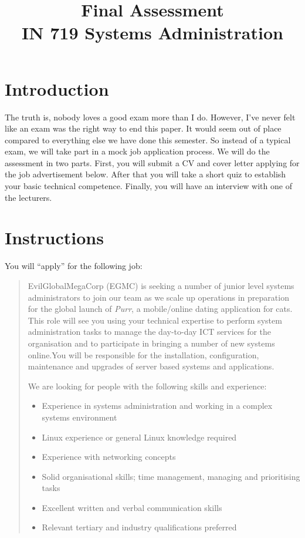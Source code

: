 \documentclass{article}   	%
\title{Final Assessment\\ IN 719  Systems Administration}
\date{}							%
\begin{document}
\maketitle

\section{Introduction}
The truth is, nobody loves a good exam more than I do. However, I've never felt like an exam was the right way to end this paper. It would seem out of place compared to everything else we have done this semester. So instead of a typical exam, we will take part in a mock job application process. We will do the assessment in two parts. First, you will submit a CV and cover letter applying for the job advertisement below. After that you will take a short quiz to establish your basic technical competence. Finally, you will have an interview with one of the lecturers.

\section{Instructions}
You will ``apply'' for the following job:

\begin{quotation}
  EvilGlobalMegaCorp (EGMC) is seeking a number of junior level systems administrators to join our team as we scale up operations in preparation for the global launch of \emph{Purr}, a mobile/online dating application for cats.  This role will see you using your technical expertise to perform system administration tasks to manage the day-to-day ICT services for the organisation and to participate in bringing a number of new systems online.You will be responsible for the installation, configuration, maintenance and upgrades of server based systems and applications.
  
  We are looking for people with the following skills and experience:
  \begin{itemize}
    \item Experience in systems administration and working in a complex systems environment
    \item Linux experience or general Linux knowledge required 
    \item Experience with networking concepts
    \item Solid organisational skills; time management, managing and prioritising tasks
    \item Excellent written and verbal communication skills
    \item Relevant tertiary and industry qualifications preferred
  \end{itemize}
\end{quotation}
\end{document}
